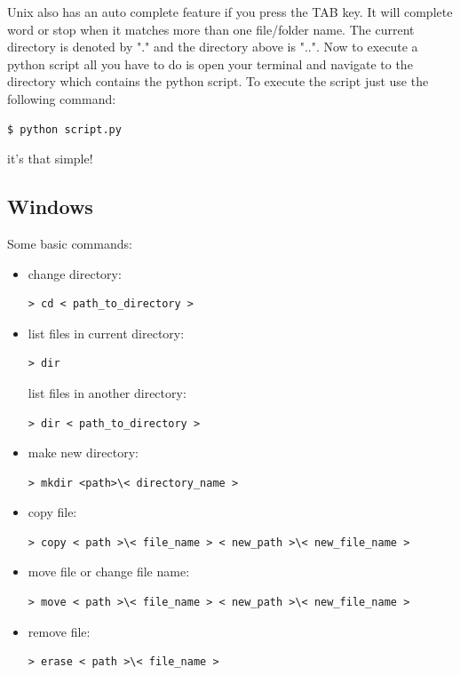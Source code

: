 \documentclass{SciPost}
\newcommand\0{\scalebox{-1}[1]{0}}
\begin{document}
\begin{appendix}
\begin{itemize}
\end{itemize}
Unix also has an auto complete feature if you press the TAB key. It will complete word or stop when it matches more than one file/folder name. The current directory is denoted by "." and the directory above is "..".
%
Now to execute a python script all you have to do is open your terminal and navigate to the directory which contains the python script. To execute the script just use the following command:
\begin{lstlisting}[numbers=none]
$ python script.py
\end{lstlisting}
it's that simple!

\subsection{Windows}
Some basic commands:

\begin{itemize}
\item change directory:
\begin{lstlisting}[numbers=none]
> cd < path_to_directory >
\end{lstlisting}
\item list files in current directory:
\begin{lstlisting}[numbers=none]
> dir
\end{lstlisting}
list files in another directory:
\begin{lstlisting}[numbers=none]
> dir < path_to_directory >
\end{lstlisting}
\item make new directory:
\begin{lstlisting}[numbers=none]
> mkdir <path>\< directory_name >
\end{lstlisting}
\item copy file:
\begin{lstlisting}[numbers=none]
> copy < path >\< file_name > < new_path >\< new_file_name >
\end{lstlisting}
\item move file or change file name:
\begin{lstlisting}[numbers=none]
> move < path >\< file_name > < new_path >\< new_file_name >
\end{lstlisting}
\item remove file:
\begin{lstlisting}[numbers=none]
> erase < path >\< file_name >
\end{lstlisting}


\end{itemize}
\end{appendix}
\end{document}
